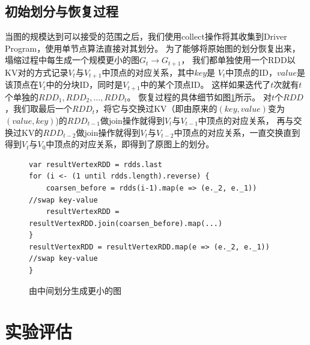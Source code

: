 \documentclass[master]{njuthesis}
\begin{document}
\subsection{初始划分与恢复过程}
当图的规模达到可以接受的范围之后，我们使用collect操作将其收集到Driver Program，使用单节点算法直接对其划分。
为了能够将原始图的划分恢复出来，塌缩过程中每生成一个规模更小的图$G_t \rightarrow G_{t+1}$，
我们都单独使用一个RDD以KV对的方式记录$V_t$与$V_{t+1}$中顶点的对应关系，其中$key$是
$V_t$中顶点的ID，$value$是该顶点在$V_t$中的分块ID，同时是$V_{t+1}$中的某个顶点ID。
这样如果迭代了$t$次就有$t$个单独的$RDD_{1}, RDD_{2}, \dots, RDD_{t}$。
恢复过程的具体细节如图\ref{fig:restore}所示。
对$t$个$RDD$，我们取最后一个$RDD_{t}$，将它与交换过KV（即由原来的$(key,value)$变为$(value, key)$)的$RDD_{t-1}$做join操作就得到$V_t$与$V_{t-1}$中顶点的对应关系，
再与交换过KV的$RDD_{t-2}$做join操作就得到$V_t$与$V_{t-2}$中顶点的对应关系，一直交换直到得到$V_t$与$V_0$中顶点的对应关系，即得到了原图上的划分。
\begin{figure}[h]
  \centering
\begin{lstlisting}
var resultVertexRDD = rdds.last
for (i <- (1 until rdds.length).reverse) {
    coarsen_before = rdds(i-1).map(e => (e._2, e._1)) //swap key-value
    resultVertexRDD = resultVertexRDD.join(coarsen_before).map(...) 
}
resultVertexRDD = resultVertexRDD.map(e => (e._2, e._1)) //swap key-value
}
\end{lstlisting}
\caption{由中间划分生成更小的图}
   \label{fig:restore}
\end{figure}
\section{实验评估}
\end{document}
